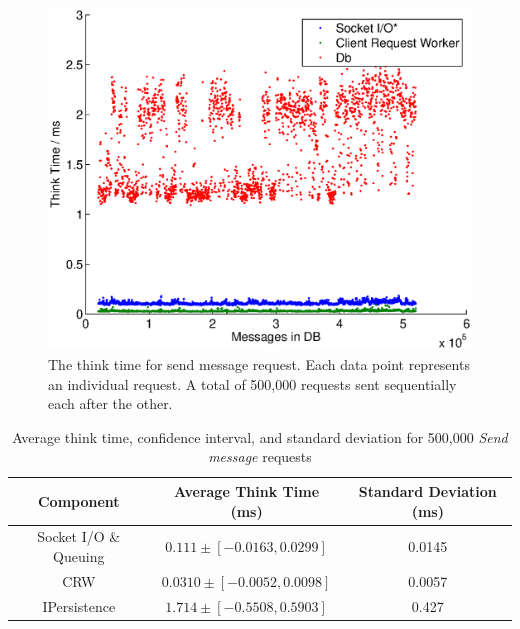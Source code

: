 \documentclass{article}
\begin{document}
                \begin{figure}[H]
                    \includegraphics[scale=0.50]{thinktime_500k_push}
                    \caption{The think time for send message request. Each data point represents an individual request. A total of 500,000 requests sent sequentially each after the other.}
                    \label{fig:thinktime_500k_push}
                \end{figure}
                \begin{table}[H]
                    \begin{tabular}{|c|c|c|}
                        \hline 
                        \textbf{Component} & \textbf{Average Think Time} (ms) & \textbf{Standard Deviation (ms)} \\ 
                        \hline 
                        Socket I/O \& Queuing & $0.111 \pm [-0.0163 , 0.0299]$ &0.0145\\ 
                        \hline 
                        CRW & $0.0310 \pm [-0.0052 , 0.0098]$ &0.0057\\ 
                        \hline 
                        IPersistence & $1.714 \pm [-0.5508 , 0.5903]$ &0.427\\ 
                        \hline 
                    \end{tabular}
                    \caption{Average think time, confidence interval, and standard deviation for 500,000 \textit{Send message} requests}
                    \label{table:thinktime_500k_push}
                \end{table} 
                
\end{document}
